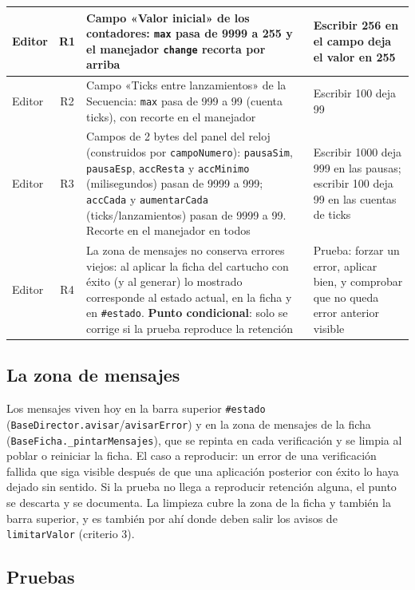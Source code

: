 \begin{xltabular}{\textwidth}{l c >{\RaggedRight\arraybackslash}X >{\RaggedRight\arraybackslash}X}
	\midrule
	Editor & R1 & Campo «Valor inicial» de los contadores: \texttt{max} pasa de 9999 a 255 y el manejador \texttt{change} recorta por arriba & Escribir 256 en el campo deja el valor en 255 \\
	\midrule
	Editor & R2 & Campo «Ticks entre lanzamientos» de la Secuencia: \texttt{max} pasa de 999 a 99 (cuenta ticks), con recorte en el manejador & Escribir 100 deja 99 \\
	\midrule
	Editor & R3 & Campos de 2 bytes del panel del reloj (construidos por \texttt{campoNumero}): \texttt{pausaSim}, \texttt{pausaEsp}, \texttt{accResta} y \texttt{accMinimo} (milisegundos) pasan de 9999 a 999; \texttt{accCada} y \texttt{aumentarCada} (ticks/lanzamientos) pasan de 9999 a 99. Recorte en el manejador en todos & Escribir 1000 deja 999 en las pausas; escribir 100 deja 99 en las cuentas de ticks \\
	\midrule
	Editor & R4 & La zona de mensajes no conserva errores viejos: al aplicar la ficha del cartucho con éxito (y al generar) lo mostrado corresponde al estado actual, en la ficha y en \texttt{\#estado}. \textbf{Punto condicional}: solo se corrige si la prueba reproduce la retención & Prueba: forzar un error, aplicar bien, y comprobar que no queda error anterior visible \\
	\bottomrule
\end{xltabular}


\subsection{La zona de mensajes}
\label{sec:F5I16Mensajes}

Los mensajes viven hoy en la barra superior \texttt{\#estado} (\texttt{BaseDirector.avisar}/\texttt{avisarError}) y en la zona de mensajes de la ficha (\texttt{BaseFicha.\_pintarMensajes}), que se repinta en cada verificación y se limpia al poblar o reiniciar la ficha. El caso a reproducir: un error de una verificación fallida que siga visible después de que una aplicación posterior con éxito lo haya dejado sin sentido. Si la prueba no llega a reproducir retención alguna, el punto se descarta y se documenta. La limpieza cubre la zona de la ficha y también la barra superior, y es también por ahí donde deben salir los avisos de \texttt{limitarValor} (criterio 3).

\subsection{Pruebas}
\label{sec:F5I16Pruebas}

